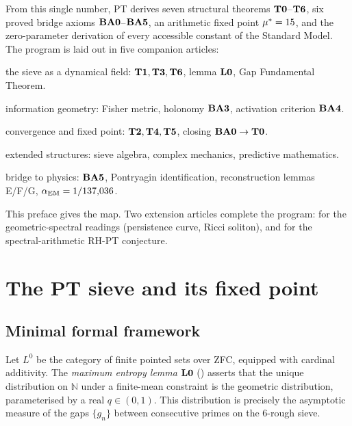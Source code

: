 From this single number, PT derives seven structural theorems $\textbf{T0}$--$\textbf{T6}$, six proved bridge axioms $\textbf{BA0}$--$\textbf{BA5}$, an arithmetic fixed point $\mu^{*} = 15$, and the zero-parameter derivation of every accessible constant of the Standard Model. The program is laid out in five companion articles:
\begin{description}[nosep,leftmargin=*]
\item[M1~\cite{companion_M1}] the sieve as a dynamical field: $\textbf{T1}, \textbf{T3}, \textbf{T6}$, lemma $\textbf{L0}$, Gap Fundamental Theorem.
\item[M2~\cite{companion_M2}] information geometry: Fisher metric, holonomy $\textbf{BA3}$, activation criterion $\textbf{BA4}$.
\item[M3~\cite{companion_M3}] convergence and fixed point: $\textbf{T2}, \textbf{T4}, \textbf{T5}$, closing $\textbf{BA0} \to \textbf{T0}$.
\item[M4~\cite{companion_M4}] extended structures: sieve algebra, complex mechanics, predictive mathematics.
\item[M5~\cite{companion_M5}] bridge to physics: $\textbf{BA5}$, Pontryagin identification, reconstruction lemmas E/F/G, $\alpha_{\rm EM} = 1/137{,}036$.
\end{description}
This preface gives the map. Two extension articles complete the program: \cite{PT_GeoSpectral} for the geometric-spectral readings (persistence curve, Ricci soliton), and \cite{PT_RH} for the spectral-arithmetic RH-PT conjecture.

\section{The PT sieve and its fixed point}
\label{sec:crible}

\subsection{Minimal formal framework}
\label{sec:crible:cadre}

Let $L^{0}$ be the category of finite pointed sets over ZFC, equipped with cardinal additivity. The \emph{maximum entropy lemma} $\textbf{L0}$ (\cite{companion_M1}) asserts that the unique distribution on $\mathbb N$ under a finite-mean constraint is the geometric distribution, parameterised by a real $q \in (0, 1)$. This distribution is precisely the asymptotic measure of the gaps $\{g_n\}$ between consecutive primes on the 6-rough sieve.

